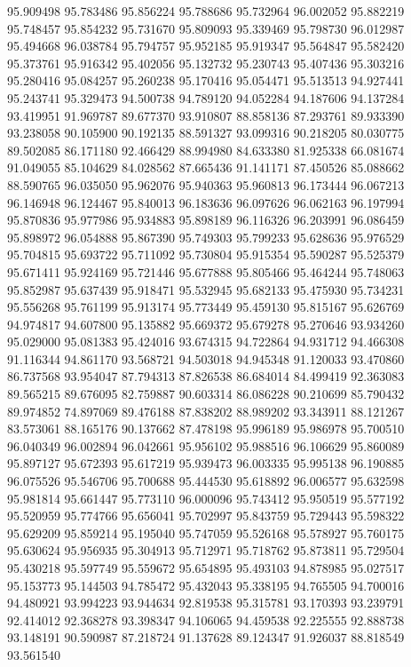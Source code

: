 95.909498
95.783486
95.856224
95.788686
95.732964
96.002052
95.882219
95.748457
95.854232
95.731670
95.809093
95.339469
95.798730
96.012987
95.494668
96.038784
95.794757
95.952185
95.919347
95.564847
95.582420
95.373761
95.916342
95.402056
95.132732
95.230743
95.407436
95.303216
95.280416
95.084257
95.260238
95.170416
95.054471
95.513513
94.927441
95.243741
95.329473
94.500738
94.789120
94.052284
94.187606
94.137284
93.419951
91.969787
89.677370
93.910807
88.858136
87.293761
89.933390
93.238058
90.105900
90.192135
88.591327
93.099316
90.218205
80.030775
89.502085
86.171180
92.466429
88.994980
84.633380
81.925338
66.081674
91.049055
85.104629
84.028562
87.665436
91.141171
87.450526
85.088662
88.590765
96.035050
95.962076
95.940363
95.960813
96.173444
96.067213
96.146948
96.124467
95.840013
96.183636
96.097626
96.062163
96.197994
95.870836
95.977986
95.934883
95.898189
96.116326
96.203991
96.086459
95.898972
96.054888
95.867390
95.749303
95.799233
95.628636
95.976529
95.704815
95.693722
95.711092
95.730804
95.915354
95.590287
95.525379
95.671411
95.924169
95.721446
95.677888
95.805466
95.464244
95.748063
95.852987
95.637439
95.918471
95.532945
95.682133
95.475930
95.734231
95.556268
95.761199
95.913174
95.773449
95.459130
95.815167
95.626769
94.974817
94.607800
95.135882
95.669372
95.679278
95.270646
93.934260
95.029000
95.081383
95.424016
93.674315
94.722864
94.931712
94.466308
91.116344
94.861170
93.568721
94.503018
94.945348
91.120033
93.470860
86.737568
93.954047
87.794313
87.826538
86.684014
84.499419
92.363083
89.565215
89.676095
82.759887
90.603314
86.086228
90.210699
85.790432
89.974852
74.897069
89.476188
87.838202
88.989202
93.343911
88.121267
83.573061
88.165176
90.137662
87.478198
95.996189
95.986978
95.700510
96.040349
96.002894
96.042661
95.956102
95.988516
96.106629
95.860089
95.897127
95.672393
95.617219
95.939473
96.003335
95.995138
96.190885
96.075526
95.546706
95.700688
95.444530
95.618892
96.006577
95.632598
95.981814
95.661447
95.773110
96.000096
95.743412
95.950519
95.577192
95.520959
95.774766
95.656041
95.702997
95.843759
95.729443
95.598322
95.629209
95.859214
95.195040
95.747059
95.526168
95.578927
95.760175
95.630624
95.956935
95.304913
95.712971
95.718762
95.873811
95.729504
95.430218
95.597749
95.559672
95.654895
95.493103
94.878985
95.027517
95.153773
95.144503
94.785472
95.432043
95.338195
94.765505
94.700016
94.480921
93.994223
93.944634
92.819538
95.315781
93.170393
93.239791
92.414012
92.368278
93.398347
94.106065
94.459538
92.225555
92.888738
93.148191
90.590987
87.218724
91.137628
89.124347
91.926037
88.818549
93.561540
